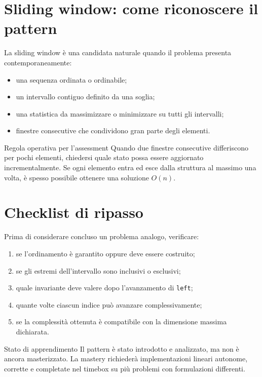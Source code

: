 \section{Sliding window: come riconoscere il pattern}

La sliding window è una candidata naturale quando il problema presenta
contemporaneamente:

\begin{itemize}
  \item una sequenza ordinata o ordinabile;
  \item un intervallo contiguo definito da una soglia;
  \item una statistica da massimizzare o minimizzare su tutti gli intervalli;
  \item finestre consecutive che condividono gran parte degli elementi.
\end{itemize}

\begin{principlebox}{Regola operativa per l'assessment}
Quando due finestre consecutive differiscono per pochi elementi, chiedersi
quale stato possa essere aggiornato incrementalmente. Se ogni elemento entra
ed esce dalla struttura al massimo una volta, è spesso possibile ottenere
una soluzione $O(n)$.
\end{principlebox}

\clearpage
\thispagestyle{fancy}
\noindent\rule{0pt}{2cm}\par
\section{Checklist di ripasso}

Prima di considerare concluso un problema analogo, verificare:

\begin{enumerate}
  \item se l'ordinamento è garantito oppure deve essere costruito;
  \item se gli estremi dell'intervallo sono inclusivi o esclusivi;
  \item quale invariante deve valere dopo l'avanzamento di \texttt{left};
  \item quante volte ciascun indice può avanzare complessivamente;
  \item se la complessità ottenuta è compatibile con la dimensione massima
        dichiarata.
\end{enumerate}

\begin{definitionbox}{Stato di apprendimento}
Il pattern è stato introdotto e analizzato, ma non è ancora masterizzato. La
mastery richiederà implementazioni lineari autonome, corrette e completate nel
timebox su più problemi con formulazioni differenti.
\end{definitionbox}
